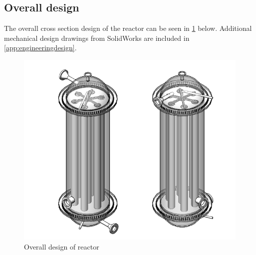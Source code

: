 \subsection{Overall design}
The overall cross section design of the reactor can be seen in \cref{fig:mainreactor} below. Additional mechanical design drawings from SolidWorks are included in \cref{app:engineeringdesign}.
\begin{figure}[h]
    \centering
    \includegraphics[width=0.6\linewidth]{chapters/2-reaction/figures/FYD reactor poster boy both.PNG}
    \caption{Overall design of reactor}
    \label{fig:mainreactor}
\end{figure}

